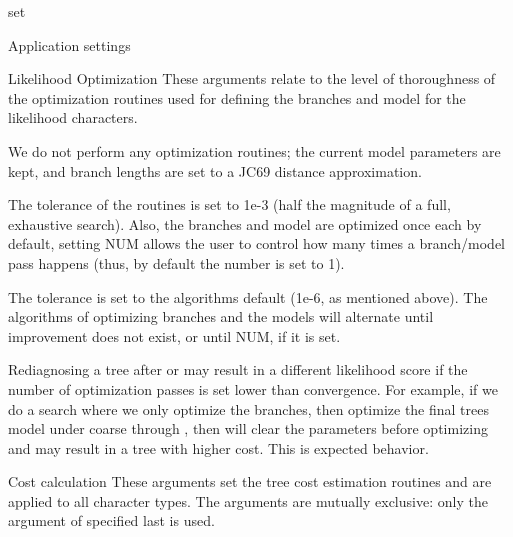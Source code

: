 \begin{command}{set}{}
\begin{arguments}
\begin{argumentgroup}{Application settings}
        \end{argumentgroup}

        \begin{argumentgroup}{Likelihood Optimization}
            {These arguments relate to the level of thoroughness of the
            optimization routines used for defining the branches and model for
            the likelihood characters.}

                {We do not perform any optimization routines; the current model
                parameters are kept, and branch lengths are set to a JC69
                distance approximation.}
                {}

                {The tolerance of the routines is set to 1e-3 (half the
                magnitude of a full, exhaustive search). Also, the branches and
                model are optimized once each by default, setting NUM allows the
                user to control how many times a branch/model pass happens
                (thus, by default the number is set to 1).}
                {}

                {The tolerance is set to the algorithms default (1e-6, as
                mentioned above). The algorithms of optimizing branches and
                the models will alternate until improvement does not exist, or
                until NUM, if it is set.}
                {}

	        \begin{statement}
                Rediagnosing a tree after  or
                 may result in a different likelihood score if
                the number of optimization passes is set lower than convergence.
                For example, if we do a search where we only optimize the
                branches, then optimize the final trees model under coarse
                through , then \poy will clear the
                parameters before optimizing and may result in a tree with
                higher cost. This is expected behavior.
            \end{statement}

        \end{argumentgroup}

        \begin{argumentgroup}{Cost calculation}
            {These arguments set the tree cost estimation routines and are
            applied to all character types. The arguments are mutually
            exclusive: only the argument of  specified last is
            used.}


\end{argumentgroup}
\end{arguments}
\end{command}
